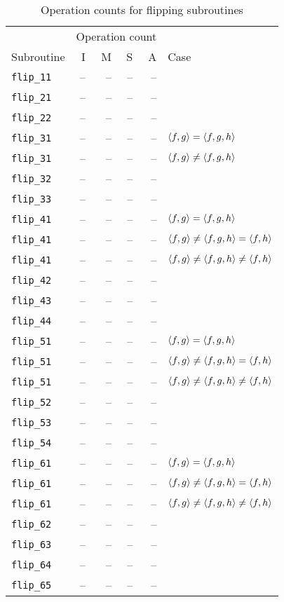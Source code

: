 \begin{table}[h]
  \caption{Operation counts for flipping subroutines}
  \label{tab_flipping_costs}
\begin{center}
\begin{tabular}{|l|rrrr|l|}
  \hline
  & \multicolumn{4}{c|}{Operation count} & \\
  Subroutine & I & M & S & A & Case \\
  \hline  
  {\tt flip\_11}  & -- & -- & -- & -- & \\
  {\tt flip\_21}  & -- & -- & -- & -- & \\
  {\tt flip\_22}  & -- & -- & -- & -- & \\
  {\tt flip\_31}  & -- & -- & -- & -- & $\left\langle f,g \right\rangle = \left\langle f,g,h \right\rangle$ \\
  {\tt flip\_31}  & -- & -- & -- & -- & $\left\langle f,g \right\rangle \neq \left\langle f,g,h \right\rangle$ \\
  {\tt flip\_32}  & -- & -- & -- & -- & \\
  {\tt flip\_33}  & -- & -- & -- & -- & \\
  {\tt flip\_41}  & -- & -- & -- & -- & $\left\langle f,g \right\rangle = \left\langle f,g,h \right\rangle$ \\
  {\tt flip\_41}  & -- & -- & -- & -- & $\left\langle f,g \right\rangle \neq \left\langle f,g,h \right\rangle = \left\langle f,h \right\rangle$ \\
  {\tt flip\_41}  & -- & -- & -- & -- & $\left\langle f,g \right\rangle \neq \left\langle f,g,h \right\rangle \neq \left\langle f,h \right\rangle$ \\
  {\tt flip\_42}  & -- & -- & -- & -- & \\
  {\tt flip\_43}  & -- & -- & -- & -- & \\
  {\tt flip\_44}  & -- & -- & -- & -- & \\
  {\tt flip\_51}  & -- & -- & -- & -- & $\left\langle f,g \right\rangle = \left\langle f,g,h \right\rangle$ \\
  {\tt flip\_51}  & -- & -- & -- & -- & $\left\langle f,g \right\rangle \neq \left\langle f,g,h \right\rangle = \left\langle f,h \right\rangle$ \\
  {\tt flip\_51}  & -- & -- & -- & -- & $\left\langle f,g \right\rangle \neq \left\langle f,g,h \right\rangle \neq \left\langle f,h \right\rangle$ \\
  {\tt flip\_52}  & -- & -- & -- & -- & \\
  {\tt flip\_53}  & -- & -- & -- & -- & \\
  {\tt flip\_54}  & -- & -- & -- & -- & \\
  {\tt flip\_61}  & -- & -- & -- & -- & $\left\langle f,g \right\rangle = \left\langle f,g,h \right\rangle$ \\
  {\tt flip\_61}  & -- & -- & -- & -- & $\left\langle f,g \right\rangle \neq \left\langle f,g,h \right\rangle = \left\langle f,h \right\rangle$ \\
  {\tt flip\_61}  & -- & -- & -- & -- & $\left\langle f,g \right\rangle \neq \left\langle f,g,h \right\rangle \neq \left\langle f,h \right\rangle$ \\
  {\tt flip\_62}  & -- & -- & -- & -- & \\
  {\tt flip\_63}  & -- & -- & -- & -- & \\
  {\tt flip\_64}  & -- & -- & -- & -- & \\
  {\tt flip\_65}  & -- & -- & -- & -- & \\
  \hline
\end{tabular}
\end{center}
\end{table}




